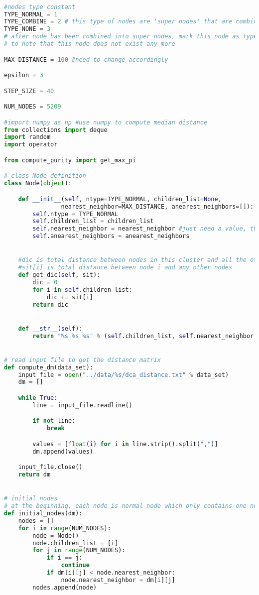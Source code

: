 \begin{lstlisting}[language={python}, caption={DSHRINK算法}, label=code:dshrink]

#nodes type constant
TYPE_NORMAL = 1
TYPE_COMBINE = 2 # this type of nodes are 'super nodes' that are combined by other nodes
TYPE_NONE = 3
# after node has been combined into super nodes, mark this node as type none
# to note that this node does not exist any more

MAX_DISTANCE = 100 #need to change accordingly

epsilon = 3

STEP_SIZE = 40

NUM_NODES = 5209

#import numpy as np #use numpy to compute median distance
from collections import deque
import random
import operator

from compute_purity import get_max_pi

# class Node definition
class Node(object):

    def __init__(self, ntype=TYPE_NORMAL, children_list=None,
                nearest_neighbor=MAX_DISTANCE, anearest_neighbors=[]):
        self.ntype = TYPE_NORMAL
        self.children_list = children_list
        self.nearest_neighbor = nearest_neighbor #just need a value, the smallest distance between this node and other nodes
        self.anearest_neighbors = anearest_neighbors


    #dic is total distance between nodes in this cluster and all the other nodes
    #sit[i] is total distance between node i and any other nodes
    def get_dic(self, sit):
        dic = 0
        for i in self.children_list:
            dic += sit[i]
        return dic


    def __str__(self):
        return "%s %s %s" % (self.children_list, self.nearest_neighbor, self.anearest_neighbors)


# read input file to get the distance matrix
def compute_dm(data_set):
    input_file = open("../data/%s/dca_distance.txt" % data_set)
    dm = []

    while True:
        line = input_file.readline()

        if not line:
            break

        values = [float(i) for i in line.strip().split(",")]
        dm.append(values)

    input_file.close()
    return dm


# initial nodes
# at the beginning, each node is normal node which only contains one node
def initial_nodes(dm):
    nodes = []
    for i in range(NUM_NODES):
        node = Node()
        node.children_list = [i]
        for j in range(NUM_NODES):
            if i == j:
                continue
            if dm[i][j] < node.nearest_neighbor:
                node.nearest_neighbor = dm[i][j]
        nodes.append(node)


\end{lstlisting}
